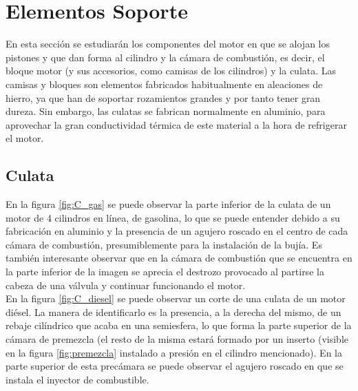\section{Elementos Soporte} \label{s:section_03}

En esta sección se estudiarán los componentes del motor en que se alojan los pistones y que dan forma al cilindro y la cámara de combustión, es decir, el bloque motor (y sus accesorios, como camisas de los cilindros) y la culata. Las camisas y bloques son elementos fabricados habitualmente en aleaciones de hierro, ya que han de soportar rozamientos grandes y por tanto tener gran dureza. Sin embargo, las culatas se fabrican normalmente en aluminio, para aprovechar la gran conductividad térmica de este material a la hora de refrigerar el motor.\\


\subsection{Culata} \label{ss:culata}

En la figura \ref{fig:C_gas} se puede observar la parte inferior de la culata de un motor de 4 cilindros en línea, de gasolina, lo que se puede entender debido a su fabricación en aluminio y la presencia de un agujero roscado en el centro de cada cámara de combustión, presumiblemente para la instalación de la bujía. Es también interesante observar que en la cámara de combustión que se encuentra en la parte inferior de la imagen se aprecia el destrozo provocado al partirse la cabeza de una válvula y continuar funcionando el motor.\\ 

En la figura \ref{fig:C_diesel} se puede observar un corte de una culata de un motor diésel. La manera de identificarlo es la presencia, a la derecha del mismo, de un rebaje cilíndrico que acaba en una semiesfera, lo que forma la parte superior de la cámara de premezcla (el resto de la misma estará formado por un inserto (visible en la figura \ref{fig:premezcla} instalado a presión en el cilindro mencionado). En la parte superior de esta precámara se puede observar el agujero roscado en que se instala el inyector de combustible.

